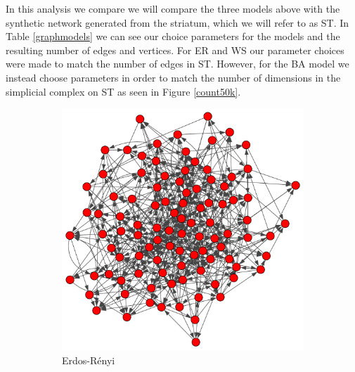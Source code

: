 In this analysis we compare we will compare the three models above with the synthetic network generated from the striatum, which we will refer to as ST. In Table \ref{graphmodels} we can see our choice parameters for the models and the resulting number of edges and vertices. For ER and WS our parameter choices were made to match the number of edges in ST. However, for the BA model we instead choose parameters in order to match the number of dimensions in the simplicial complex on ST as seen in Figure \ref{count50k}.
\begin{figure}[ht]
  \centering
  \begin{subfigure}{.33 \linewidth}
    \includegraphics[scale=0.2]{random_graphs/erdos100v500e.pdf}
    \caption{Erdos-Rényi}
  \end{subfigure}%
  \begin{subfigure}{.33 \linewidth}


\end{subfigure}
\end{figure}
